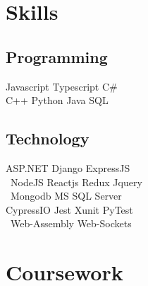\documentclass[]{deedy-resume-openfont}
\begin{document}
\begin{minipage}[t]{0.33\textwidth}

\section{Skills}
\subsection{Programming}
Javascript \textbullet{} Typescript \textbullet{} C\#\\
C++ \textbullet{} Python \textbullet{} Java \textbullet{} SQL \\
\sectionsep
\subsection{Technology} 
ASP.NET  \textbullet{} Django  \textbullet{} ExpressJS   \\\
NodeJS \textbullet{} Reactjs  \textbullet{} Redux \textbullet{} Jquery \\\   
Mongodb \textbullet{} MS SQL Server  \textbullet{} \\ %
CypressIO \textbullet{} Jest \textbullet{} Xunit \textbullet{} PyTest\\\
Web-Assembly \textbullet{} Web-Sockets %

\sectionsep




\section{Coursework}

\end{minipage}
\end{document}
